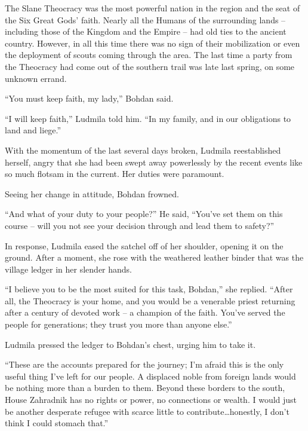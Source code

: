  

The Slane Theocracy was the most powerful nation in the region and the seat of the Six Great Gods’ faith. Nearly all the Humans of the surrounding lands – including those of the Kingdom and the Empire – had old ties to the ancient country. However, in all this time there was no sign of their mobilization or even the deployment of scouts coming through the area. The last time a party from the Theocracy had come out of the southern trail was late last spring, on some unknown errand.

 

“You must keep faith, my lady,” Bohdan said.

 

“I will keep faith,” Ludmila told him. “In my family, and in our obligations to land and liege.”

 

With the momentum of the last several days broken, Ludmila reestablished herself, angry that she had been swept away powerlessly by the recent events like so much flotsam in the current. Her duties were paramount.

 

Seeing her change in attitude, Bohdan frowned.

 

“And what of your duty to your people?” He said, “You’ve set them on this course – will you not see your decision through and lead them to safety?”

 

In response, Ludmila eased the satchel off of her shoulder, opening it on the ground. After a moment, she rose with the weathered leather binder that was the village ledger in her slender hands.

 

“I believe you to be the most suited for this task, Bohdan,” she replied. “After all, the Theocracy is your home, and you would be a venerable priest returning after a century of devoted work – a champion of the faith. You’ve served the people for generations; they trust you more than anyone else.”

 

Ludmila pressed the ledger to Bohdan's chest, urging him to take it.

 

“These are the accounts prepared for the journey; I’m afraid this is the only useful thing I’ve left for our people. A displaced noble from foreign lands would be nothing more than a burden to them. Beyond these borders to the south, House Zahradnik has no rights or power, no connections or wealth. I would just be another desperate refugee with scarce little to contribute…honestly, I don’t think I could stomach that.”

